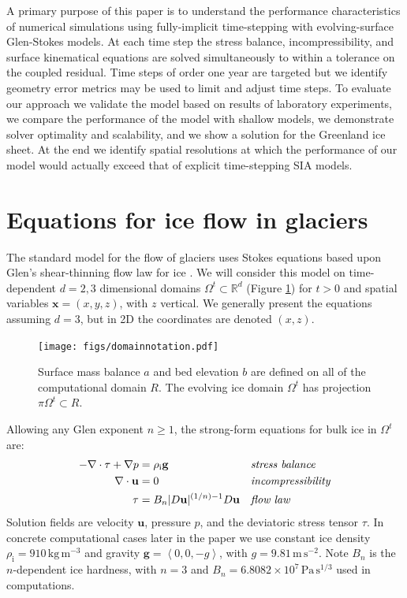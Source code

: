 \documentclass[letterpaper,final,12pt,reqno]{amsart}
\newcommand{\RR}{\mathbb{R}}
\newcommand{\bg}{\mathbf{g}}
\newcommand{\bu}{\mathbf{u}}
\newcommand{\bx}{\mathbf{x}}
\newcommand{\rhoi}{\rho_{\text{i}}}
\begin{document}
A primary purpose of this paper is to understand the performance characteristics of numerical simulations using fully-implicit time-stepping with evolving-surface Glen-Stokes models.  At each time step the stress balance, incompressibility, and surface kinematical equations are solved simultaneously to within a tolerance on the coupled residual.  Time steps of order one year are targeted but we identify geometry error metrics may be used to limit and adjust time steps.  To evaluate our approach we validate the model based on results of laboratory experiments, we compare the performance of the model with shallow models, we demonstrate solver optimality and scalability, and we show a solution for the Greenland ice sheet.  At the end we identify spatial resolutions at which the performance of our model would actually exceed that of explicit time-stepping SIA models.


\section{Equations for ice flow in glaciers} \label{sec:strongform}

The standard model for the flow of glaciers uses Stokes equations based upon Glen's shear-thinning flow law for ice \cite{GreveBlatter2009,JouvetRappaz2011,SchoofHewitt2013}.  We will consider this model on time-dependent $d=2,3$ dimensional domains $\Omega^t \subset \RR^d$ (Figure \ref{fig:domainnotation}) for $t>0$ and spatial variables $\bx=(x,y,z)$, with $z$ vertical.  We generally present the equations assuming $d=3$, but in 2D the coordinates are denoted $(x,z)$.

\begin{figure}[ht]
\begin{center}
\texttt{[image: figs/domainnotation.pdf]}
\end{center}
\caption{Surface mass balance $a$ and bed elevation $b$ are defined on all of the computational domain $R$.  The evolving ice domain $\Omega^t$ has projection $\pi \Omega^t \subset R$.}
\label{fig:domainnotation}
\end{figure}

Allowing any Glen exponent $n\ge 1$, the strong-form equations for bulk ice in $\Omega^t$ are:
\begin{align}
- \nabla \cdot \tau + \nabla p &= \rhoi \bg &&\text{\emph{stress balance}} \label{forcebalance} \\
\nabla \cdot \bu &= 0 &&\text{\emph{incompressibility}} \label{incompressible} \\
\tau &= B_n |D\bu|^{(1/n) - 1} D\bu  &&\text{\emph{flow law}} \label{viscflowlaw}
\end{align}
Solution fields are velocity $\bu$, pressure $p$, and the deviatoric stress tensor $\tau$.  In concrete computational cases later in the paper we use constant ice density $\rhoi=910 \,\text{kg}\,\text{m}^{-3}$ and gravity $\bg=\left<0,0,-g\right>$, with $g=9.81\,\text{m}\,\text{s}^{-2}$.  Note $B_n$ is the $n$-dependent ice hardness, with $n=3$ and $B_n=6.8082\times 10^7\,\text{Pa}\,\text{s}^{1/3}$ \cite{Bueleretal2005} used in computations.
\end{document}
